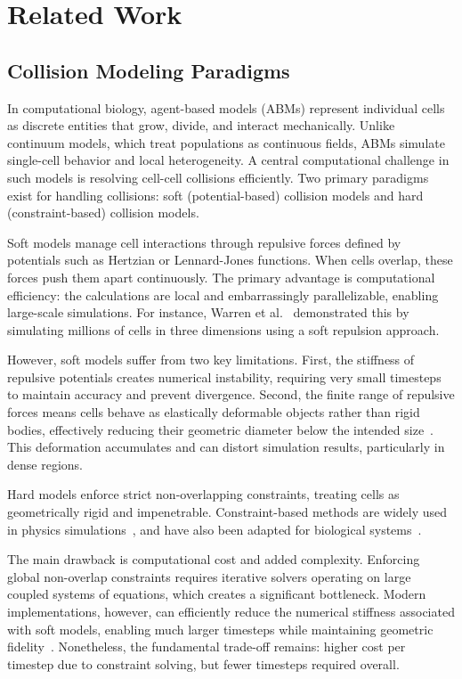 \documentclass[conference]{IEEEtran}
\begin{document}
\section{Related Work}

\subsection{Collision Modeling Paradigms}

In computational biology, agent-based models (ABMs) represent individual cells as discrete entities that grow, divide, and interact mechanically. Unlike continuum models, which treat populations as continuous fields, ABMs simulate single-cell behavior and local heterogeneity. A central computational challenge in such models is resolving cell-cell collisions efficiently. Two primary paradigms exist for handling collisions: soft (potential-based) collision models and hard (constraint-based) collision models.

\begin{description}[style=nextline]
    \item[Soft (Potential-Based) Models]
        Soft models manage cell interactions through repulsive forces defined by potentials such as Hertzian or Lennard-Jones functions. When cells overlap, these forces push them apart continuously. The primary advantage is computational efficiency: the calculations are local and embarrassingly parallelizable, enabling large-scale simulations. For instance, Warren et al.~\cite{Warren2019} demonstrated this by simulating millions of cells in three dimensions using a soft repulsion approach.

        However, soft models suffer from two key limitations. First, the stiffness of repulsive potentials creates numerical instability, requiring very small timesteps to maintain accuracy and prevent divergence. Second, the finite range of repulsive forces means cells behave as elastically deformable objects rather than rigid bodies, effectively reducing their geometric diameter below the intended size~\cite{Yan2019}. This deformation accumulates and can distort simulation results, particularly in dense regions.

    \item[Hard (Constraint-Based) Models]
        Hard models enforce strict non-overlapping constraints, treating cells as geometrically rigid and impenetrable. Constraint-based methods are widely used in physics simulations~\cite{Tasora2008,Macklin2014,Li2021,Ferguson2021}, and have also been adapted for biological systems~\cite{Rudge2012,Weady2024,Yan2019}.

        The main drawback is computational cost and added complexity. Enforcing global non-overlap constraints requires iterative solvers operating on large coupled systems of equations, which creates a significant bottleneck. Modern implementations, however, can efficiently reduce the numerical stiffness associated with soft models, enabling much larger timesteps while maintaining geometric fidelity~\cite{Yan2019}. Nonetheless, the fundamental trade-off remains: higher cost per timestep due to constraint solving, but fewer timesteps required overall.
\end{description}
\end{document}
